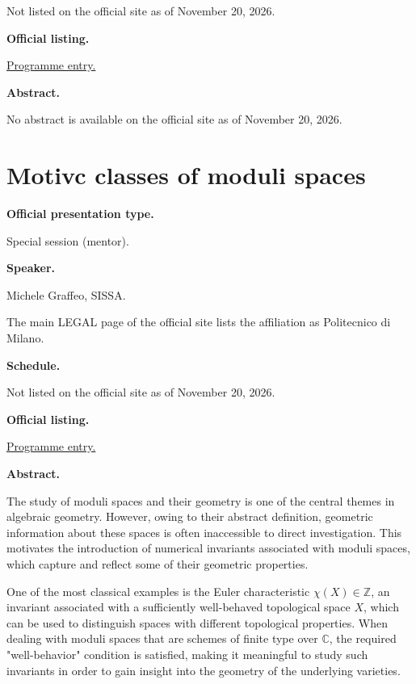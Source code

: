 Not listed on the official site as of
November 20, 2026.

\medskip\noindent
{\bf Official listing.}

\href{%
https://sites.google.com/view/%
geoalgcompluff/legal/%
legal-2027-resumos#h.6f5k7zdb7c47%
}{Programme entry.}

\medskip\noindent
{\bf Abstract.}

No abstract is available on the
official site as of November 20, 2026.

\section{Motivc classes of moduli spaces}
\label{section-motivc-classes-of-moduli}

\medskip\noindent
{\bf Official presentation type.}

Special session (mentor).

\medskip\noindent
{\bf Speaker.}

Michele Graffeo, SISSA.

The main LEGAL page of the official site
lists the affiliation as Politecnico di
Milano.

\medskip\noindent
{\bf Schedule.}

Not listed on the official site as of
November 20, 2026.

\medskip\noindent
{\bf Official listing.}

\href{%
https://sites.google.com/view/%
geoalgcompluff/legal/%
legal-2027-resumos#h.6f5k7zdb7c47%
}{Programme entry.}

\medskip\noindent
{\bf Abstract.}

The study of moduli spaces and their geometry
is one of the central themes in algebraic
geometry. However, owing to their abstract
definition, geometric information about these
spaces is often inaccessible to direct
investigation. This motivates the
introduction of numerical invariants
associated with moduli spaces, which capture
and reflect some of their geometric
properties.

One of the most classical examples is the
Euler characteristic $\chi(X)\in\mathbb{Z}$,
an invariant associated with a sufficiently
well-behaved topological space $X$, which can
be used to distinguish spaces with different
topological properties. When dealing with
moduli spaces that are schemes of finite type
over $\mathbb{C}$, the required
"well-behavior" condition is satisfied,
making it meaningful to study such invariants
in order to gain insight into the geometry of
the underlying varieties.

